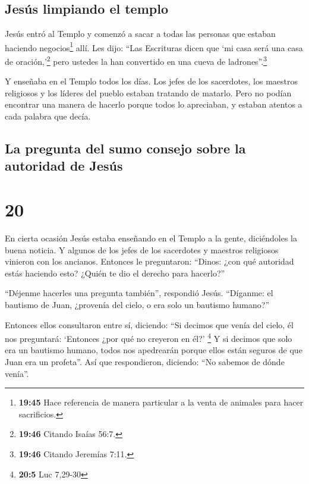 \hypertarget{jesuxfas-limpiando-el-templo}{%
\subsection{Jesús limpiando el
templo}\label{jesuxfas-limpiando-el-templo}}

 Jesús entró al Templo y comenzó a sacar a todas las
personas que estaban haciendo negocios\footnote{\textbf{19:45} Hace
  referencia de manera particular a la venta de animales para hacer
  sacrificios.} allí.  Les dijo: ``Las Escrituras dicen
que `mi casa será una casa de oración,'\footnote{\textbf{19:46} Citando
  Isaías 56:7.} pero ustedes la han convertido en una cueva de
ladrones''.\footnote{\textbf{19:46} Citando Jeremías 7:11.}

 Y enseñaba en el Templo todos los días. Los jefes de los
sacerdotes, los maestros religiosos y los líderes del pueblo estaban
tratando de matarlo.  Pero no podían encontrar una manera
de hacerlo porque todos lo apreciaban, y estaban atentos a cada palabra
que decía.

\hypertarget{la-pregunta-del-sumo-consejo-sobre-la-autoridad-de-jesuxfas}{%
\subsection{La pregunta del sumo consejo sobre la autoridad de
Jesús}\label{la-pregunta-del-sumo-consejo-sobre-la-autoridad-de-jesuxfas}}

\hypertarget{section-19}{%
\section{20}\label{section-19}}

 En cierta ocasión Jesús estaba enseñando en el Templo a
la gente, diciéndoles la buena noticia. Y algunos de los jefes de los
sacerdotes y maestros religiosos vinieron con los ancianos.
 Entonces le preguntaron: ``Dinos: ¿con qué autoridad
estás haciendo esto? ¿Quién te dio el derecho para hacerlo?''

 ``Déjenme hacerles una pregunta también'', respondió
Jesús. ``Díganme:  el bautismo de Juan, ¿provenía del
cielo, o era solo un bautismo humano?''

 Entonces ellos consultaron entre sí, diciendo: ``Si
decimos que venía del cielo, él nos preguntará: `Entonces ¿por qué no
creyeron en él?' \footnote{\textbf{20:5} Luc 7,29-30}  Y
si decimos que solo era un bautismo humano, todos nos apedrearán porque
ellos están seguros de que Juan era un profeta''.  Así que
respondieron, diciendo: ``No sabemos de dónde venía''.

